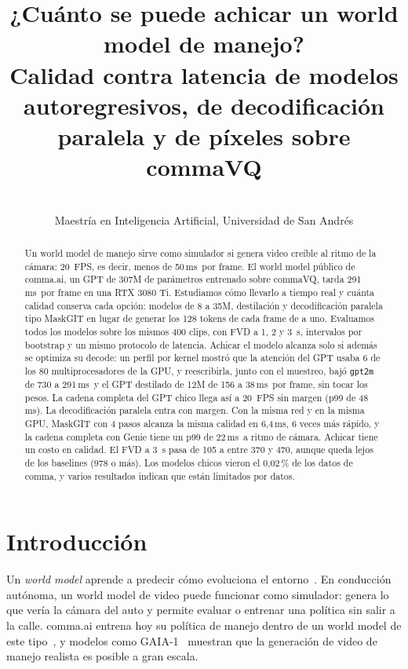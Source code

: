 \documentclass[10pt,twocolumn,a4paper]{article}
\title{¿Cuánto se puede achicar un world model de manejo?\\
\large Calidad contra latencia de modelos autoregresivos, de decodificación paralela y de píxeles sobre commaVQ}
\author{\editado{Bautista Peco, Tomás Morales y Kevin Soulier} \\ Maestría en Inteligencia Artificial, Universidad de San Andrés}
\date{}
\DeclareRobustCommand{\editado}[1]{\textcolor{editado}{#1}}
\DeclareRobustCommand{\editado}[1]{#1}
\newcommand{\ms}{\,ms}
\begin{document}
\maketitle

\begin{abstract}
\editado{Un world model de manejo sirve como simulador si genera video creíble al ritmo de la cámara: 20~FPS, es decir, menos de 50\ms\ por frame. El world model público de comma.ai, un GPT de 307M de parámetros entrenado sobre commaVQ, tarda 291\ms\ por frame en una RTX 3080 Ti. Estudiamos cómo llevarlo a tiempo real y cuánta calidad conserva cada opción: modelos de 8 a 35M, destilación y decodificación paralela tipo MaskGIT en lugar de generar los 128 tokens de cada frame de a uno. Evaluamos todos los modelos sobre los mismos 400 clips, con FVD a 1, 2 y 3~s, intervalos por bootstrap y un mismo protocolo de latencia. Achicar el modelo alcanza solo si además se optimiza su decode: un perfil por kernel mostró que la atención del GPT usaba 6 de los 80 multiprocesadores de la GPU, y reescribirla, junto con el muestreo, bajó \texttt{gpt2m} de 730 a 291\ms\ y el GPT destilado de 12M de 156 a 38\ms\ por frame, sin tocar los pesos. La cadena completa del GPT chico llega así a 20~FPS sin margen (p99 de 48\ms). La decodificación paralela entra con margen. Con la misma red y en la misma GPU, MaskGIT con 4 pasos alcanza la misma calidad en 6,4\ms, 6 veces más rápido, y la cadena completa con Genie tiene un p99 de 22\ms\ a ritmo de cámara. Achicar tiene un costo en calidad. El FVD a 3~s pasa de 105 a entre 370 y 470, aunque queda lejos de los baselines (978 o más). Los modelos chicos vieron el 0,02\,\% de los datos de comma, y varios resultados indican que están limitados por datos.}
\end{abstract}

\section{Introducción}

Un \emph{world model} aprende a predecir cómo evoluciona el entorno~\cite{ha2018worldmodels}. En conducción autónoma, un world model de video puede funcionar como simulador: genera lo que vería la cámara del auto y permite evaluar o entrenar una política sin salir a la calle. comma.ai entrena hoy su política de manejo dentro de un world model de este tipo~\cite{goff2025learning}, y modelos como GAIA-1~\cite{hu2023gaia1} muestran que la generación de video de manejo realista es posible a gran escala.
\end{document}
